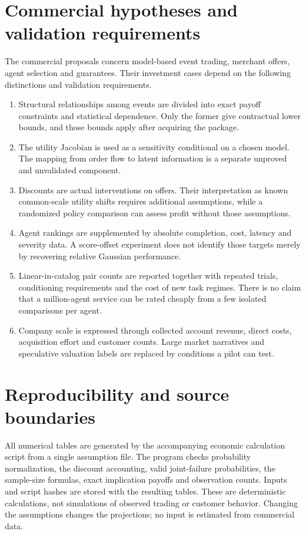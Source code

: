 \documentclass[11pt]{article}
\theoremstyle{remark}\newtheorem{example}{Example}
\begin{document}
\section{Commercial hypotheses and validation requirements}
The commercial proposals concern model-based event trading, merchant offers,
agent selection and guarantees. Their investment cases depend on the
following distinctions and validation requirements.
\begin{enumerate}
\item Structural relationships among events are divided into exact payoff
constraints and statistical dependence. Only the former give contractual
lower bounds, and those bounds apply after acquiring the package.
\item The utility Jacobian is used as a sensitivity conditional on a chosen
model. The mapping from order flow to latent information is a separate
unproved and unvalidated component.
\item Discounts are actual interventions on offers. Their interpretation as
known common-scale utility shifts requires additional assumptions, while a
randomized policy comparison can assess profit without those assumptions.
\item Agent rankings are supplemented by absolute completion, cost, latency
and severity data. A score-offset experiment does not identify those targets
merely by recovering relative Gaussian performance.
\item Linear-in-catalog pair counts are reported together with repeated trials,
conditioning requirements and the cost of new task regimes. There is no
claim that a million-agent service can be rated cheaply from a few isolated
comparisons per agent.
\item Company scale is expressed through collected account revenue, direct
costs, acquisition effort and customer counts. Large market narratives and
speculative valuation labels are replaced by conditions a pilot can test.
\end{enumerate}

\section{Reproducibility and source boundaries}
All numerical tables are generated by the accompanying economic calculation
script from a single assumption file. The program checks probability
normalization, the discount accounting, valid joint-failure probabilities,
the sample-size formulas, exact implication payoffs and observation counts.
Inputs and script hashes are stored with the resulting tables. These are
deterministic calculations, not simulations of observed trading or customer
behavior. Changing the assumptions changes the projections; no input is
estimated from commercial data.
\end{document}
